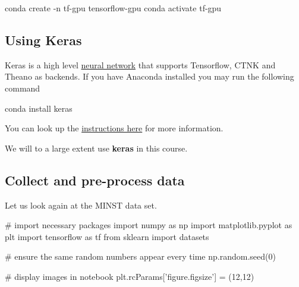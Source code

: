 \documentclass[%
oneside,                 %
final,                   %
10pt]{article}
\begin{document}
\bpycod
conda create -n tf-gpu tensorflow-gpu
conda activate tf-gpu

\epycod


\subsection{Using Keras}

Keras is a high level \href{{https://en.wikipedia.org/wiki/Application_programming_interface}}{neural network}
that supports Tensorflow, CTNK and Theano as backends.  
If you have Anaconda installed you may run the following command


\bpycod
conda install keras

\epycod

You can look up the \href{{https://keras.io/}}{instructions here} for more information.

We will to a large extent use \textbf{keras} in this course. 

\subsection{Collect and pre-process data}

Let us look again at the MINST data set.













































\bpycod
# import necessary packages
import numpy as np
import matplotlib.pyplot as plt
import tensorflow as tf
from sklearn import datasets


# ensure the same random numbers appear every time
np.random.seed(0)

# display images in notebook
plt.rcParams['figure.figsize'] = (12,12)
\end{document}
